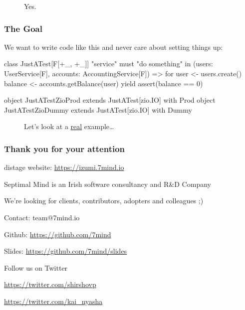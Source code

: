\documentclass[usenames,dvipsnames]{beamer}
\begin{document}
\begin{frame}
  \begin{figure}
  \Huge Yes.
  \end{figure}
\end{frame}


\begin{frame}[fragile]
\frametitle{The Goal}

We want to write code like this and never care about setting things up:

\begin{scalacode}
class JustATest[F[+_, +_]] {
  "service" must {
    "do something" in {
      (users: UserService[F], accounts: AccountingService[F]) =>
      for {
        user  <- users.create()
        balance <- accounts.getBalance(user)
      } yield {
        assert(balance == 0)
      }
    }
  }
}

object JustATestZioProd extends JustATest[zio.IO] with Prod
object JustATestZioDummy extends JustATest[zio.IO] with Dummy
\end{scalacode}
\end{frame}


\begin{frame}
  \begin{figure}
  \Huge Let's look at a \underline{real} example\dots
  \end{figure}
\end{frame}


\begin{frame}
    \frametitle{Thank you for your attention}
    \begin{center}
      distage website: \url{https://izumi.7mind.io}
    \end{center}
    \begin{center}
      \color{RubineRed}
      Septimal Mind is an Irish software consultancy and R\&D Company

      \vspace{0.3cm}
      We're looking for clients, contributors, adopters and colleagues ;)
    \end{center}
    \begin{center}
      Contact: team@7mind.io

      \vspace{0.3cm}
      Github: \url{https://github.com/7mind}

      \vspace{0.3cm}
      Slides: \url{https://github.com/7mind/slides}
    \end{center}
    \begin{center}
      \color{RoyalBlue}
      Follow us on Twitter

      \vspace{0.3cm}
      \url{https://twitter.com/shirshovp}

      \vspace{0.3cm}
      \url{https://twitter.com/kai_nyasha}
    \end{center}
\end{frame}
\end{document}
